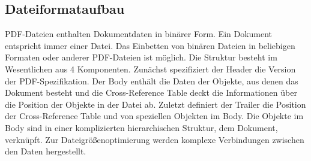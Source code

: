 \subsection{Dateiformataufbau}
PDF-Dateien enthalten Dokumentdaten in binärer Form. Ein Dokument entspricht immer einer Datei. Das Einbetten von binären Dateien in beliebigen Formaten oder anderer PDF-Dateien ist möglich. Die Struktur besteht im Wesentlichen aus 4 Komponenten. Zunächst spezifiziert der Header die Version der PDF-Spezifikation. Der Body enthält die Daten der Objekte, aus denen das Dokument besteht und die Cross-Reference Table deckt die Informationen über die Position der Objekte in der Datei ab. Zuletzt definiert der Trailer die Position der Cross-Reference Table und von speziellen Objekten im Body. Die Objekte im Body sind in einer komplizierten hierarchischen Struktur, dem Dokument, verknüpft. Zur Dateigrößenoptimierung werden komplexe Verbindungen zwischen den Daten hergestellt.
